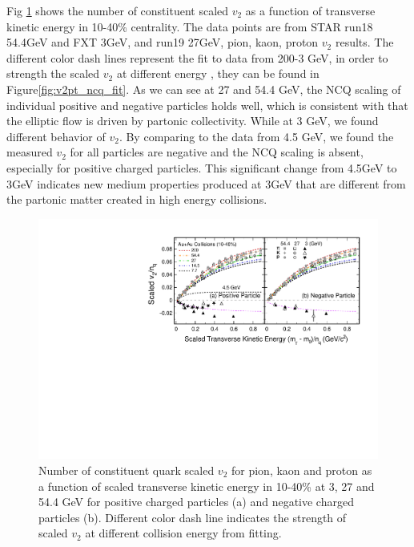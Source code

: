 Fig \ref{fig:v2pt_ncq} shows the number of constituent scaled $v_{2}$ as a function of transverse kinetic energy in 10-40\% centrality. The data points are from STAR run18 54.4GeV and FXT 3GeV, and run19 27GeV, pion, kaon, proton $v_{2}$ results. The different color dash lines represent the fit to data from 200-3 GeV, in order to strength the scaled $v_{2}$ at different energy \cite{Dong:2004ve}, they can be found in Figure\ref{fig:v2pt_ncq_fit}. As we can see at 27 and 54.4 GeV, the NCQ scaling of individual positive and negative particles holds well, which is consistent with that the elliptic flow is driven by partonic collectivity. While at 3 GeV, we found different behavior of $v_{2}$. By comparing to the data from 4.5 GeV, we found the measured $v_{2}$ for all particles are negative and the NCQ scaling is absent, especially for positive charged particles. This significant change from 4.5GeV to 3GeV indicates new medium properties produced at 3GeV that are different from the partonic matter created in high energy collisions. 

\begin{figure}[h]
\includegraphics[scale=0.6]{FXT3gev/chapter4/fig/v2pt_ncq.pdf}
\caption{Number of constituent quark scaled $v_{2}$ for pion, kaon and proton as a function of scaled transverse kinetic energy in 10-40\% at 3, 27 and 54.4 GeV for positive charged particles (a) and negative charged particles (b). Different color dash line indicates the strength of scaled $v_{2}$ at different collision energy from fitting.}
\label{fig:v2pt_ncq}
\end{figure}

